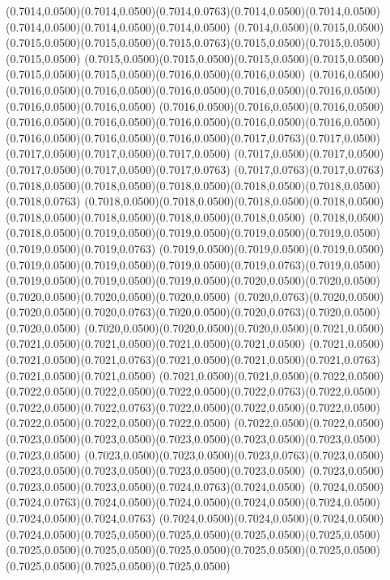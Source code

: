 (0.7014,0.0500)(0.7014,0.0500)(0.7014,0.0763)(0.7014,0.0500)(0.7014,0.0500)(0.7014,0.0500)(0.7014,0.0500)(0.7014,0.0500)
(0.7014,0.0500)(0.7015,0.0500)(0.7015,0.0500)(0.7015,0.0500)(0.7015,0.0763)(0.7015,0.0500)(0.7015,0.0500)(0.7015,0.0500)
(0.7015,0.0500)(0.7015,0.0500)(0.7015,0.0500)(0.7015,0.0500)(0.7015,0.0500)(0.7015,0.0500)(0.7016,0.0500)(0.7016,0.0500)
(0.7016,0.0500)(0.7016,0.0500)(0.7016,0.0500)(0.7016,0.0500)(0.7016,0.0500)(0.7016,0.0500)(0.7016,0.0500)(0.7016,0.0500)
(0.7016,0.0500)(0.7016,0.0500)(0.7016,0.0500)(0.7016,0.0500)(0.7016,0.0500)(0.7016,0.0500)(0.7016,0.0500)(0.7016,0.0500)
(0.7016,0.0500)(0.7016,0.0500)(0.7016,0.0500)(0.7017,0.0763)(0.7017,0.0500)(0.7017,0.0500)(0.7017,0.0500)(0.7017,0.0500)
(0.7017,0.0500)(0.7017,0.0500)(0.7017,0.0500)(0.7017,0.0500)(0.7017,0.0763)
\PST@Solid(0.7017,0.0763)(0.7017,0.0763)(0.7018,0.0500)(0.7018,0.0500)(0.7018,0.0500)(0.7018,0.0500)(0.7018,0.0500)(0.7018,0.0763)
(0.7018,0.0500)(0.7018,0.0500)(0.7018,0.0500)(0.7018,0.0500)(0.7018,0.0500)(0.7018,0.0500)(0.7018,0.0500)(0.7018,0.0500)
(0.7018,0.0500)(0.7018,0.0500)(0.7019,0.0500)(0.7019,0.0500)(0.7019,0.0500)(0.7019,0.0500)(0.7019,0.0500)(0.7019,0.0763)
(0.7019,0.0500)(0.7019,0.0500)(0.7019,0.0500)(0.7019,0.0500)(0.7019,0.0500)(0.7019,0.0500)(0.7019,0.0763)(0.7019,0.0500)
(0.7019,0.0500)(0.7019,0.0500)(0.7019,0.0500)(0.7020,0.0500)(0.7020,0.0500)(0.7020,0.0500)(0.7020,0.0500)(0.7020,0.0500)
(0.7020,0.0763)(0.7020,0.0500)(0.7020,0.0500)(0.7020,0.0763)(0.7020,0.0500)(0.7020,0.0763)(0.7020,0.0500)(0.7020,0.0500)
(0.7020,0.0500)(0.7020,0.0500)(0.7020,0.0500)(0.7021,0.0500)(0.7021,0.0500)(0.7021,0.0500)(0.7021,0.0500)(0.7021,0.0500)
(0.7021,0.0500)(0.7021,0.0500)(0.7021,0.0763)(0.7021,0.0500)(0.7021,0.0500)(0.7021,0.0763)(0.7021,0.0500)(0.7021,0.0500)
(0.7021,0.0500)(0.7021,0.0500)(0.7022,0.0500)(0.7022,0.0500)(0.7022,0.0500)(0.7022,0.0500)(0.7022,0.0763)(0.7022,0.0500)
(0.7022,0.0500)(0.7022,0.0763)(0.7022,0.0500)(0.7022,0.0500)(0.7022,0.0500)(0.7022,0.0500)(0.7022,0.0500)(0.7022,0.0500)
(0.7022,0.0500)(0.7022,0.0500)(0.7023,0.0500)(0.7023,0.0500)(0.7023,0.0500)(0.7023,0.0500)(0.7023,0.0500)(0.7023,0.0500)
(0.7023,0.0500)(0.7023,0.0500)(0.7023,0.0763)(0.7023,0.0500)(0.7023,0.0500)(0.7023,0.0500)(0.7023,0.0500)(0.7023,0.0500)
(0.7023,0.0500)(0.7023,0.0500)(0.7023,0.0500)(0.7024,0.0763)(0.7024,0.0500)
\PST@Solid(0.7024,0.0500)(0.7024,0.0763)(0.7024,0.0500)(0.7024,0.0500)(0.7024,0.0500)(0.7024,0.0500)(0.7024,0.0500)(0.7024,0.0763)
(0.7024,0.0500)(0.7024,0.0500)(0.7024,0.0500)(0.7024,0.0500)(0.7025,0.0500)(0.7025,0.0500)(0.7025,0.0500)(0.7025,0.0500)
(0.7025,0.0500)(0.7025,0.0500)(0.7025,0.0500)(0.7025,0.0500)(0.7025,0.0500)(0.7025,0.0500)(0.7025,0.0500)(0.7025,0.0500)
